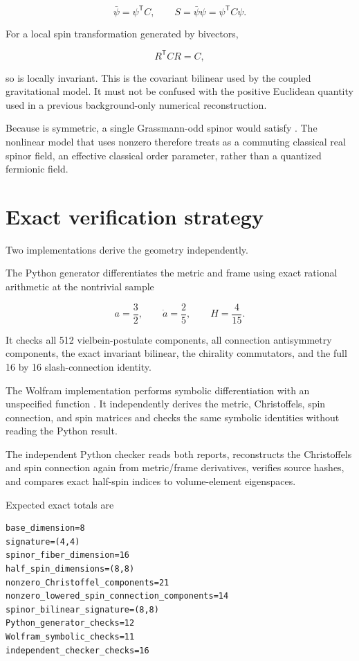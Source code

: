 \documentclass[11pt]{article}
\begin{document}
\[
\bar\psi=\psi^{\mathsf T}C,
\qquad
S=\bar\psi\psi=\psi^{\mathsf T}C\psi.
\]

For a local spin transformation \texttt{} generated by bivectors,

\[
R^{\mathsf T}CR=C,
\]

so \texttt{} is locally \texttt{} invariant. This is the covariant bilinear used by the coupled gravitational model. It must not be confused with the positive Euclidean quantity \texttt{} used in a previous background-only numerical reconstruction.

Because \texttt{} is symmetric, a single Grassmann-odd spinor would satisfy \texttt{}. The nonlinear model that uses nonzero \texttt{} therefore treats \texttt{} as a commuting classical real spinor field, an effective classical order parameter, rather than a quantized fermionic field.

\section{Exact verification strategy}

Two implementations derive the geometry independently.

The Python generator differentiates the metric and frame using exact rational arithmetic at the nontrivial sample

\[
a=\frac32,
\qquad \dot a=\frac25,
\qquad H=\frac4{15}.
\]

It checks all 512 vielbein-postulate components, all connection antisymmetry components, the exact invariant bilinear, the chirality commutators, and the full 16 by 16 slash-connection identity.

The Wolfram implementation performs symbolic differentiation with an unspecified function \texttt{}. It independently derives the metric, Christoffels, spin connection, and spin matrices and checks the same symbolic identities without reading the Python result.

The independent Python checker reads both reports, reconstructs the Christoffels and spin connection again from metric/frame derivatives, verifies source hashes, and compares exact half-spin indices to volume-element eigenspaces.

Expected exact totals are

\begin{Verbatim}[fontsize=\small]
base_dimension=8
signature=(4,4)
spinor_fiber_dimension=16
half_spin_dimensions=(8,8)
nonzero_Christoffel_components=21
nonzero_lowered_spin_connection_components=14
spinor_bilinear_signature=(8,8)
Python_generator_checks=12
Wolfram_symbolic_checks=11
independent_checker_checks=16
\end{Verbatim}
\end{document}
